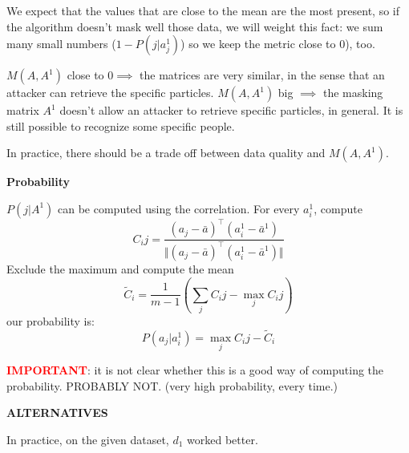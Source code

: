 \documentclass{article}
\begin{document}
We expect that the values that are close to the mean are the most present, so if the algorithm doesn't mask well those data, we will weight this fact: we sum many small numbers ($1-P(j| a_j^1)$) so we keep the metric close to $0$), too.

$M(A,A^1)$ close to $0 \implies $ the matrices are very similar, in the sense that an attacker can retrieve the specific particles. $M(A,A^1)$ big $\implies$ the masking matrix $A^1$ doesn't allow an attacker to retrieve specific particles, in general. It is still possible to recognize some specific people.

In practice, there should be a trade off between data quality and $M(A,A^1)$.

\textbf{Probability}

$P(j | A^1)$ can be computed using the correlation.
For every $a^1_i$, compute
\begin{equation}
	C_ij = \frac{(a_j - \bar{a})^\top (a^1_i - \bar{a}^1)}{\Vert (a_j - \bar{a})^\top (a^1_i - \bar{a}^1) \Vert}
\end{equation}
Exclude the maximum and compute the mean
\begin{equation}
	\tilde{C}_i = \frac{1}{m-1} (\sum_{j} C_ij - \max_j C_ij)
\end{equation}
our probability is:
\begin{equation}
	P(a_j | a_i^1) = \max_j C_ij - \tilde{C}_i
\end{equation}

\textcolor{red}{\textbf{IMPORTANT}}: it is not clear whether this is a good way of computing the probability. PROBABLY NOT. (very high probability, every time.)

\textbf{ALTERNATIVES}

In practice, on the given dataset, $d_1$ worked better.
\end{document}
